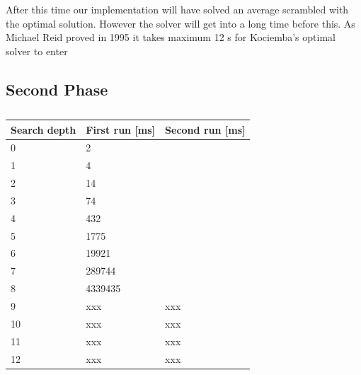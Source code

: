 After this time our implementation will have solved an average scrambled \rubik{} with the optimal solution.
However the solver will get into  a long time before this.
As Michael Reid proved in 1995 it takes maximum 12 \twist{}s for Kociemba's optimal solver to enter 

\subsection{Second Phase}

\begin{table}[hb]
\centering
	\begin{tabular}{|l|l|l|}
	\hline
	Search depth&First run [ms]&Second run [ms]\\
	\hline
	0&2&\\
	\hline
	1&4&\\
	\hline
	2&14&\\
	\hline
	3&74&\\
	\hline
	4&432&\\
	\hline
	5&1775&\\
	\hline
	6&19921&\\
	\hline
	7&289744&\\
	\hline
	8&4339435&\\
	\hline
	9&xxx&xxx\\
	\hline
	10&xxx&xxx\\
	\hline
	11&xxx&xxx\\
	\hline
	12&xxx&xxx\\
	\hline
	\end{tabular}
\caption{}
	\label{tab:timeData2}
\end{table}